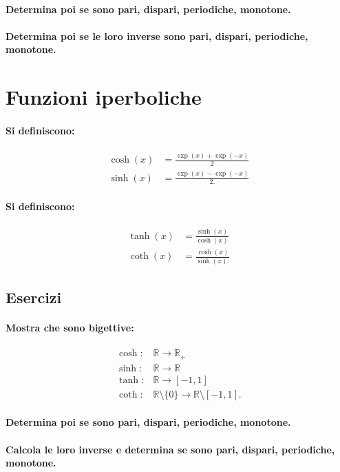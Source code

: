 \documentclass{article}
\begin{document}
\paragraph{Determina poi se sono pari, dispari, periodiche, monotone.}

\paragraph{Determina poi se le loro inverse sono pari, dispari, periodiche, monotone.}

\newpage
\section*{Funzioni iperboliche}

\paragraph{Si definiscono:}

\begin{align*}
\cosh(x) &= \frac{\exp(x) + \exp(- x)}{2}\\
\sinh(x) &= \frac{\exp(x) - \exp(- x)}{2.}
\end{align*}

\paragraph{Si definiscono:}

\begin{align*}
\tanh(x) &= \frac{\sinh(x)}{\cosh(x)}\\
\coth(x) &= \frac{\cosh(x)}{\sinh(x).}
\end{align*}

\subsection*{Esercizi}

\paragraph{Mostra che sono bigettive:}

\begin{align*}
\cosh:& {\mathbb R} \rightarrow {\mathbb R}_+\\
\sinh:& {\mathbb R} \rightarrow {\mathbb R}\\
\tanh:& {\mathbb R} \rightarrow [- 1, 1]\\
\coth:& {\mathbb R} \setminus \{0\} \rightarrow {\mathbb R} \setminus [-1, 1].
\end{align*}

\paragraph{Determina poi se sono pari, dispari, periodiche, monotone.}

\paragraph{Calcola le loro inverse e determina se sono pari, dispari, periodiche, monotone.}
\end{document}

